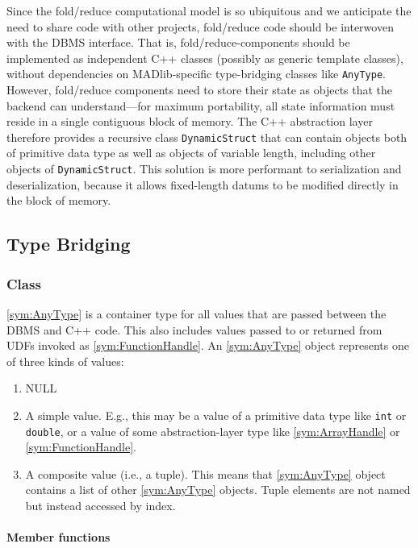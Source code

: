 Since the fold/reduce computational model is so ubiquitous and we anticipate the need to share code with other projects, fold/reduce code should be interwoven with the DBMS interface. That is, fold/reduce-components should be implemented as independent C++ classes (possibly as generic template classes), without dependencies on MADlib-specific type-bridging classes like \texttt{AnyType}. However, fold/reduce components need to store their state as objects that the backend can understand---for maximum portability, all state information must reside in a single contiguous block of memory. The C++ abstraction layer therefore provides a recursive class \texttt{DynamicStruct} that can contain objects both of primitive data type as well as objects of variable length, including other objects of \texttt{DynamicStruct}. This solution is more performant to serialization and deserialization, because it allows fixed-length datums to be modified directly in the block of memory.

\subsection{Type Bridging}

\subsubsection[Class AnyType]{Class }

\ref{sym:AnyType} is a container type for all values that are passed between the DBMS and C++ code. This also includes values passed to or returned from UDFs invoked as \ref{sym:FunctionHandle}. An \ref{sym:AnyType} object represents one of three kinds of values:
\begin{enumerate}
	\item NULL
	\item A simple value. E.g., this may be a value of a primitive data type like \texttt{int} or \texttt{double}, or a value of some abstraction-layer type like \ref{sym:ArrayHandle} or \ref{sym:FunctionHandle}.
	\item A composite value (i.e., a tuple). This means that \ref{sym:AnyType} object contains a list of other \ref{sym:AnyType} objects. Tuple elements are not named but instead accessed by index.
\end{enumerate}

\paragraph{Member functions}

